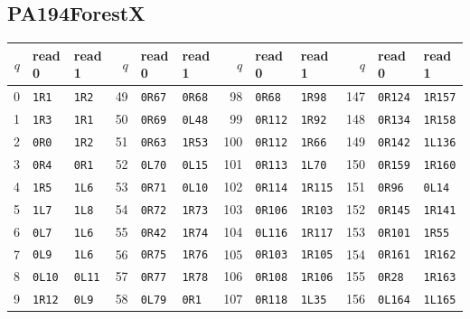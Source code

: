\subsection{PA194ForestX}
\begin{center}\fontsize{8.5}{9.3}\selectfont
\setlength{\tabcolsep}{5pt}\renewcommand{\arraystretch}{1.03}
\begin{tabular}{rll@{\hspace{12pt}}rll@{\hspace{12pt}}rll@{\hspace{12pt}}rll}
\toprule
$q$ & read 0 & read 1 & $q$ & read 0 & read 1 & $q$ & read 0 & read 1 & $q$ & read 0 & read 1\\\midrule
0 & \texttt{1R1} & \texttt{1R2} & 49 & \texttt{0R67} & \texttt{0R68} & 98 & \texttt{0R68} & \texttt{1R98} & 147 & \texttt{0R124} & \texttt{1R157}\\
1 & \texttt{1R3} & \texttt{1R1} & 50 & \texttt{0R69} & \texttt{0L48} & 99 & \texttt{0R112} & \texttt{1R92} & 148 & \texttt{0R134} & \texttt{1R158}\\
2 & \texttt{0R0} & \texttt{1R2} & 51 & \texttt{0R63} & \texttt{1R53} & 100 & \texttt{0R112} & \texttt{1R66} & 149 & \texttt{0R142} & \texttt{1L136}\\
3 & \texttt{0R4} & \texttt{0R1} & 52 & \texttt{0L70} & \texttt{0L15} & 101 & \texttt{0R113} & \texttt{1L70} & 150 & \texttt{0R159} & \texttt{1R160}\\
4 & \texttt{1R5} & \texttt{1L6} & 53 & \texttt{0R71} & \texttt{0L10} & 102 & \texttt{0R114} & \texttt{1R115} & 151 & \texttt{0R96} & \texttt{0L14}\\
5 & \texttt{1L7} & \texttt{1L8} & 54 & \texttt{0R72} & \texttt{1R73} & 103 & \texttt{0R106} & \texttt{1R103} & 152 & \texttt{0R145} & \texttt{1R141}\\
6 & \texttt{0L7} & \texttt{1L6} & 55 & \texttt{0R42} & \texttt{1R74} & 104 & \texttt{0L116} & \texttt{1R117} & 153 & \texttt{0R101} & \texttt{1R55}\\
7 & \texttt{0L9} & \texttt{1L6} & 56 & \texttt{0R75} & \texttt{1R76} & 105 & \texttt{0R103} & \texttt{1R105} & 154 & \texttt{0R161} & \texttt{1R162}\\
8 & \texttt{0L10} & \texttt{0L11} & 57 & \texttt{0R77} & \texttt{1R78} & 106 & \texttt{0R108} & \texttt{1R106} & 155 & \texttt{0R28} & \texttt{1R163}\\
9 & \texttt{1R12} & \texttt{0L9} & 58 & \texttt{0L79} & \texttt{0R1} & 107 & \texttt{0R118} & \texttt{1L35} & 156 & \texttt{0L164} & \texttt{1L165}\\

\end{tabular}
\end{center}
